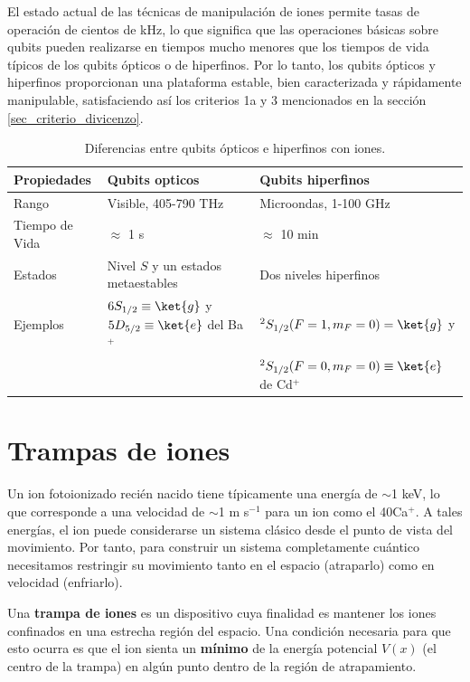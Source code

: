 El estado actual de las técnicas de manipulación de iones permite tasas de operación de cientos de kHz, lo que significa que las operaciones básicas sobre qubits pueden realizarse en tiempos mucho menores que los tiempos de vida típicos de los qubits ópticos o de hiperfinos. Por lo tanto, los qubits ópticos y hiperfinos proporcionan una plataforma estable, bien caracterizada y rápidamente manipulable, satisfaciendo así los criterios 1a y 3 mencionados en la sección \ref{sec_criterio_divicenzo}.

\begin{table}[H]
\centering
\begin{tabular}{lll} \hline
Propiedades & Qubits opticos & Qubits hiperfinos \\ \hline
Rango & Visible, 405-790 THz & Microondas, 1-100 GHz \\
Tiempo de Vida & $\approx$ 1 s & $\approx$ 10 min \\
Estados & Nivel $S$ y un estados metaestables & Dos niveles  hiperfinos \\
Ejemplos & $6S_{1/2} \equiv \ket{g}$ y $5D_{5/2} \equiv \ket{e}$ del Ba${}^+$ & ${}^2S_{1/2} (F=1,m_F=0) = \ket{g}$ y \\
 & & ${}^2S_{1/2} (F=0,m_F=0) \equiv \ket{e}$ de Cd${}^+$ \\ \hline
\end{tabular}
\caption{Diferencias entre qubits ópticos e hiperfinos con iones.}
\label{Tab_ions_opticos_hiperfinos}
\end{table}



\section{Trampas de iones}

Un ion fotoionizado recién nacido tiene típicamente una energía de $\sim$1 keV, lo que corresponde a una velocidad de $\sim$1 m s${}^{-1}$ para un ion como el 40Ca${}^+$. A tales energías, el ion puede considerarse un sistema clásico desde el punto de vista del movimiento. Por tanto, para construir un sistema completamente cuántico necesitamos restringir su movimiento tanto en el espacio (atraparlo) como en velocidad (enfriarlo).

Una \textbf{trampa de iones} es un dispositivo cuya finalidad es mantener los iones confinados en una estrecha región del espacio. Una condición necesaria para que esto ocurra es que el ion sienta un \textbf{mínimo} de la energía potencial $V(x)$ (el centro de la trampa) en algún punto dentro de la región de atrapamiento. 

